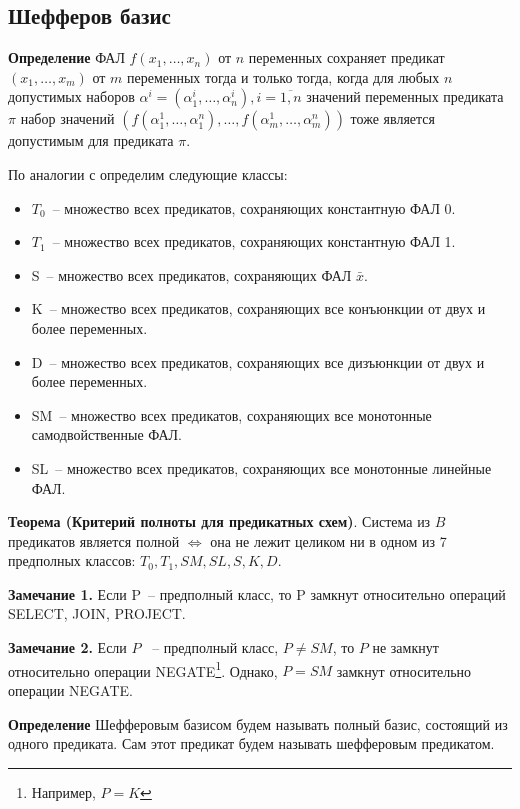 \documentclass[12pt]{article}
\begin{document}
\subsection{Шефферов базис}

\textbf{Определение} ФАЛ
$f (x_1, \ldots, x_n)$ от $n$ переменных сохраняет предикат $ (x_1, \ldots, x_m)$ от $m$
переменных тогда и только тогда, когда для любых $n$ допустимых наборов $\alpha^i = (\alpha_1^i, \ldots, \alpha_n^i), 
i = \overline{1, n}$ значений переменных предиката $\pi$ набор
значений $( f(\alpha_1^1, \ldots, \alpha_1^n), \ldots, f(\alpha_m^1, \ldots, \alpha_m^n) )$
тоже является допустимым для предиката $\pi$.

По аналогии с \cite{Shu11} определим следующие классы:
\begin{itemize}
    \item{$T_0$}~-- множество всех предикатов, сохраняющих константную ФАЛ 0.
    \item{$T_1$}~-- множество всех предикатов, сохраняющих константную ФАЛ 1.
    \item{S}~-- множество всех предикатов, сохраняющих ФАЛ $\bar{x}$.
    \item{K}~-- множество всех предикатов, сохраняющих все конъюнкции от двух и более переменных.
    \item{D}~-- множество всех предикатов, сохраняющих все дизъюнкции от двух и более переменных.
    \item{SM}~-- множество всех предикатов, сохраняющих все монотонные самодвойственные ФАЛ.
    \item{SL}~-- множество всех предикатов, сохраняющих все монотонные линейные ФАЛ.
\end{itemize}

\textbf{Теорема (Критерий полноты для предикатных схем)}. Система из $B$ предикатов является полной $\iff$
она не лежит целиком ни в одном из 7 предполных классов: $T_0, T_1, SM, SL, S, K, D$. \cite{Shu11} 

\textbf{Замечание 1.} Если P~-- предполный класс, то P замкнут относительно операций SELECT, JOIN, PROJECT.

\textbf{Замечание 2.} Если $P$ ~-- предполный класс, $P \neq SM$, то $P$ не замкнут
относительно операции NEGATE\footnote{Например, $P = K$}.
Однако, $P = SM$ замкнут относительно операции NEGATE.

\textbf{Определение} Шефферовым базисом будем называть полный базис, состоящий из одного предиката. Сам этот предикат
будем называть шефферовым предикатом.
\end{document}
